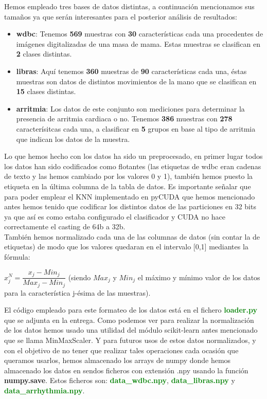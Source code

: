 \documentclass[10pt,a4paper]{article}
\begin{document}
Hemos empleado tres bases de datos distintas, a continuación mencionamos sus tamaños ya que serán interesantes para el posterior análisis de resultados:\\

\begin{itemize}
\item \textbf{wdbc}: Tenemos \textbf{569} muestras con \textbf{30} características cada una procedentes de imágenes digitalizadas de una masa de mama. Estas muestras se clasifican en \textbf{2} clases distintas.
\item \textbf{libras}: Aquí tenemos \textbf{360} muestras de \textbf{90} características cada una, éstas muestras son datos de distintos movimientos de la mano que se clasifican en \textbf{15} clases distintas.
\item \textbf{arritmia}: Los datos de este conjunto son mediciones para determinar la presencia de arritmia cardiaca o no. Tenemos \textbf{386} muestras con \textbf{278} caracterísitcas cada una, a clasificar en \textbf{5} grupos en base al tipo de arritmia que indican los datos de la muestra.
\end{itemize}

Lo que hemos hecho con los datos ha sido un preprocesado, en primer lugar todos los datos han sido codificados como flotantes (las etiquetas de wdbc eran cadenas de texto y las hemos cambiado por los valores 0 y 1), también hemos puesto la etiqueta en la última columna de la tabla de datos. Es importante señalar que para poder emplear el KNN implementado en pyCUDA que hemos mencionado antes hemos tenido que codificar los distintos datos de las particiones en 32 bits ya que así es como estaba configurado el clasificador y CUDA no hace correctamente el casting de 64b a 32b.\\

También hemos normalizado cada una de las columnas de datos (sin contar la de etiquetas) de modo que los valores quedaran en el intervalo [0,1] mediantes la fórmula:\\

\begin{center}
$x_j^N = \dfrac{x_j - Min_j}{Max_j-Min_j}$ (siendo $Max_j$ y $Min_j$ el máximo y mínimo valor de los datos para la característica j-ésima de las muestras).
\end{center}

El código empleado para este formateo de los datos está en el fichero \textbf{\textcolor{green}{loader.py}} que se adjunta en la entrega. Como podemos ver para realizar la normalización de los datos hemos usado una utilidad del módulo scikit-learn antes mencionado que se llama MinMaxScaler. Y para futuros usos de estos datos normalizados, y con el objetivo de no tener que realizar tales operaciones cada ocasión que queramos usarlos, hemos almacenado los arrays de numpy donde hemos almacenado los datos en sendos ficheros con extensión .npy usando la función \textbf{numpy.save}. Estos ficheros son: \textbf{\textcolor{green}{data\_wdbc.npy}}, \textbf{\textcolor{green}{data\_libras.npy}} y \textbf{\textcolor{green}{data\_arrhythmia.npy}}.\\
\end{document}
